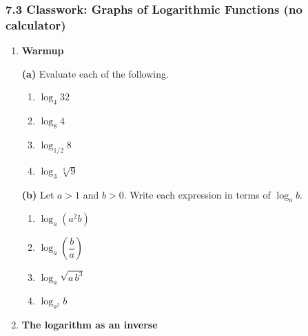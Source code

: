 \documentclass[12pt, twoside]{article}
\begin{document}
\subsubsection*{7.3 Classwork: Graphs of Logarithmic Functions (no calculator)}

\begin{enumerate}[itemsep=0.5cm]

\item[1.] \textbf{Warmup}

\textbf{(a)} Evaluate each of the following.

\begin{enumerate}[label=(\roman*), itemsep=1cm]
  \item $\log_4 32$
  \vspace{0.6cm}

  \item $\log_8 4$
  \vspace{0.6cm}

  \item $\log_{1/2} 8$
  \vspace{0.6cm}

  \item $\log_3 \sqrt[3]{9}$
  \vspace{1cm}
\end{enumerate}

\textbf{(b)} Let $a > 1$ and $b > 0$. Write each expression in terms of
$\log_a b$.

\begin{enumerate}[label=(\roman*), itemsep=1cm]
  \item $\log_a (a^2 b)$
  \vspace{0.6cm}

  \item $\log_a \!\left(\dfrac{b}{a}\right)$
  \vspace{0.6cm}

  \item $\log_a \sqrt{a\, b^3}$
  \vspace{0.6cm}

  \item $\log_{a^2} b$
  \vspace{0.6cm}
\end{enumerate}

\newpage

\item[2.] \textbf{The logarithm as an inverse}


\end{enumerate}
\end{document}
